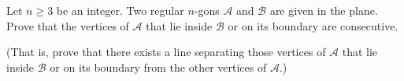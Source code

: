 Let 
$n\ge3$
 be an integer. Two regular 
$n$-gons 
$\mathcal{A}$
 and 
$\mathcal{B}$
 are given in the plane. Prove that the vertices of 
$\mathcal{A}$
 that lie inside 
$\mathcal{B}$
 or on its boundary are consecutive.

(That is, prove that there exists a line separating those vertices of 
$\mathcal{A}$
 that lie inside 
$\mathcal{B}$
 or on its boundary from the other vertices of 
$\mathcal{A}$.)
